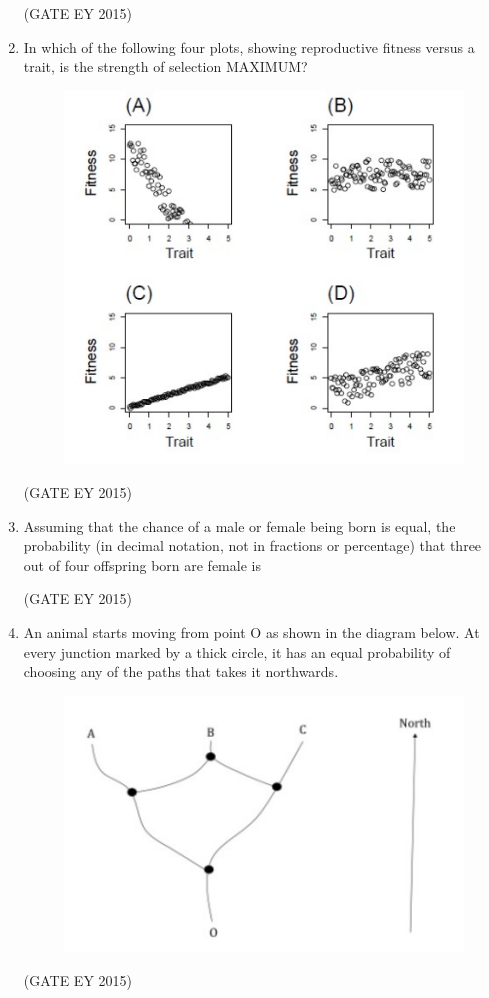 \documentclass[journal,12pt,onecolumn]{IEEEtran}
\theoremstyle{remark}
\begin{document}
\begin{enumerate}
\hfill{(GATE EY 2015)}


\item 
In which of the following four plots, showing reproductive fitness versus a trait, is the strength of selection MAXIMUM?

\begin{figure}[H]
    \centering
    \includegraphics[]{figs/Q.48.png}
    \caption{}
    \label{fig:9}
\end{figure}
\hfill{(GATE EY 2015)}






\item 
Assuming that the chance of a male or female being born is equal, the probability (in decimal notation, not in fractions or percentage) that three out of four offspring born are female is \underline{\hspace{1.5cm}}


\hfill{(GATE EY 2015)}

\item An animal starts moving from point O as shown in the diagram below. At every junction marked by a thick circle, it has an equal probability of choosing any of the paths that takes it northwards.
\begin{figure}[H]
    \centering
    \includegraphics[]{figs/Q.50.png}
    \caption{}
    \label{fig:10}
\end{figure}
\hfill{(GATE EY 2015)}



\end{enumerate}
\end{document}
